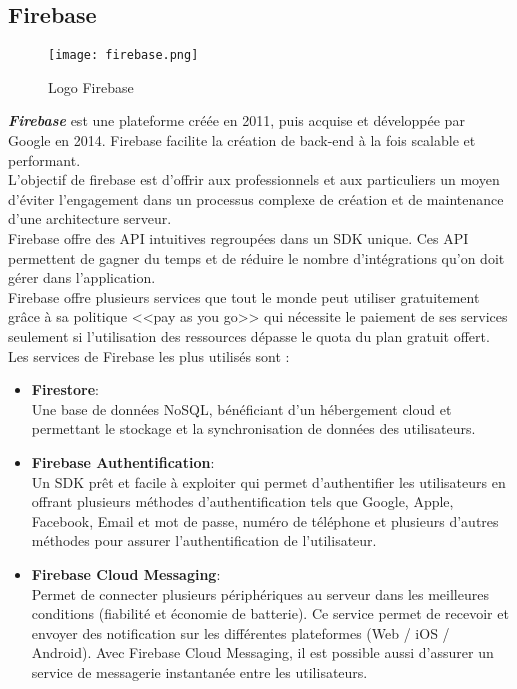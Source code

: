 \subsection{Firebase}
\vspace{1cm}
\begin{figure}[H]
    \centering
    \texttt{[image: firebase.png]}
    \vspace{1cm}
    \captionsetup{justification=centering}

    \caption{Logo Firebase}
    \label{fig:firebase_logo}
\end{figure}
\textit{\textbf{Firebase}} \cite{firebase} est une plateforme créée en 2011, puis acquise et développée par Google en 2014. Firebase facilite la création de back-end à la fois scalable et performant.\\
\noindent L'objectif de firebase est d'offrir aux professionnels et aux particuliers un moyen d'éviter l'engagement dans un processus complexe de création et de maintenance d'une architecture serveur.\\
\noindent Firebase offre des API intuitives regroupées dans un SDK unique. Ces API permettent de gagner du temps et de réduire le nombre d'intégrations qu'on doit gérer dans l'application.\\
\noindent Firebase offre plusieurs services que tout le monde peut utiliser gratuitement grâce à sa politique <<pay as you go>> qui nécessite le paiement de ses services seulement si l'utilisation des ressources dépasse le quota du plan gratuit offert. Les services de Firebase les plus utilisés sont :
\begin{itemize}
    \item \textbf{Firestore}:\\ Une base de données NoSQL, bénéficiant d'un hébergement cloud et permettant le stockage et la synchronisation de données des utilisateurs.
    \item \textbf{Firebase Authentification}:\\ Un SDK prêt et facile à exploiter qui permet d'authentifier les utilisateurs en offrant plusieurs méthodes d'authentification tels que Google, Apple, Facebook, Email et mot de passe, numéro de téléphone et plusieurs d'autres méthodes pour assurer l'authentification de l'utilisateur.
    \item \textbf{Firebase Cloud Messaging}:\\ Permet de connecter plusieurs périphériques au serveur dans les meilleures conditions (fiabilité et économie de batterie). Ce service permet de recevoir et envoyer des notification sur les différentes plateformes (Web / iOS / Android). Avec Firebase Cloud Messaging, il est possible aussi d'assurer un service de messagerie instantanée entre les utilisateurs.
\end{itemize}
